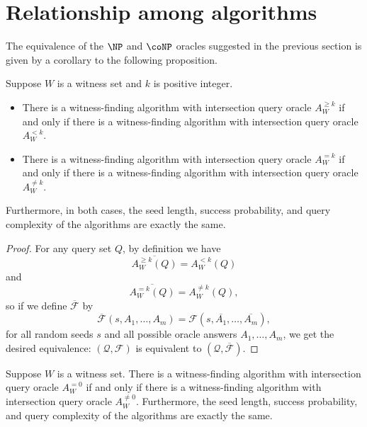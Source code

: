 \documentclass{article}
\newcommand{\mc}{\mathcal}
\begin{document}
\section{Relationship among algorithms}

The equivalence of the $\NP$ and $\coNP$ oracles suggested in the previous section is given by a corollary to the following proposition.

\begin{proposition}\label{prop:flip}
  Suppose $W$ is a witness set and $k$ is positive integer.
  \begin{itemize}
  \item There is a witness-finding algorithm with intersection query oracle $A^{\geq k}_W$ if and only if there is a witness-finding algorithm with intersection query oracle $A^{< k}_W$.
  \item There is a witness-finding algorithm with intersection query oracle $A^{= k}_W$ if and only if there is a witness-finding algorithm with intersection query oracle $A^{\neq k}_W$.
  \end{itemize}
  Furthermore, in both cases, the seed length, success probability, and query complexity of the algorithms are exactly the same.
\end{proposition}
\begin{proof}
  For any query set $Q$, by definition we have
  \begin{equation*}
    \overline{A^{\geq k}_W(Q)} = A^{< k}_W(Q)
  \end{equation*}
  and
  \begin{equation*}
    \overline{A^{= k}_W(Q)} = A^{\neq k}_W(Q),
  \end{equation*}
  so if we define $\overline{\mc{F}}$ by
  \begin{equation*}
    \overline{\mc{F}}(s, A_1, \dotsc, A_m) = \mc{F}(s, \overline{A_1}, \dotsc, \overline{A_m}),
  \end{equation*}
  for all random seeds $s$ and all possible oracle answers $A_1, \dotsc, A_m$, we get the desired equivalence: $(\mc{Q}, \mc{F})$ is equivalent to $(\mc{Q}, \overline{\mc{F}})$.
\end{proof}

\begin{corollary}\label{cor:flip}
  Suppose $W$ is a witness set.
  There is a witness-finding algorithm with intersection query oracle $A^{= 0}_W$ if and only if there is a witness-finding algorithm with intersection query oracle $A^{\neq 0}_W$.
  Furthermore, the seed length, success probability, and query complexity of the algorithms are exactly the same.
\end{corollary}
\end{document}
